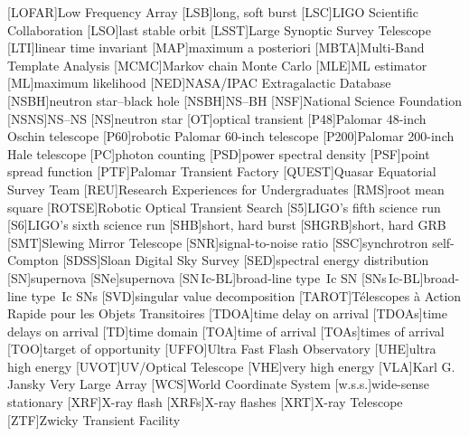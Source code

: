 \begin{acronym}
[LOFAR]{Low Frequency Array}
[LSB]{long, soft burst}
[LSC]{\ac{LIGO} Scientific Collaboration}
[LSO]{last stable orbit}
[LSST]{Large Synoptic Survey Telescope}
[LTI]{linear time invariant}
[MAP]{maximum a posteriori}
[MBTA]{Multi-Band Template Analysis}
[MCMC]{Markov chain Monte Carlo}
[MLE]{\ac{ML} estimator}
[ML]{maximum likelihood}
[NED]{NASA/IPAC Extragalactic Database}
[NSBH]{neutron star\nobreakdashes--black hole}
[NSBH]{\acl{NS}\nobreakdashes--\acl{BH}}
[NSF]{National Science Foundation}
[NSNS]{\acl{NS}\nobreakdashes--\acl{NS}}
[NS]{neutron star}
[OT]{optical transient}
[P48]{Palomar 48\nobreakdashes-inch Oschin telescope}
[P60]{robotic Palomar 60\nobreakdashes-inch telescope}
[P200]{Palomar 200\nobreakdashes-inch Hale telescope}
[PC]{photon counting}
[PSD]{power spectral density}
[PSF]{point spread function}
[PTF]{Palomar Transient Factory}
[QUEST]{Quasar Equatorial Survey Team}
[REU]{Research Experiences for Undergraduates}
[RMS]{root mean square}
[ROTSE]{Robotic Optical Transient Search}
[S5]{\ac{LIGO}'s fifth science run}
[S6]{\ac{LIGO}'s sixth science run}
[SHB]{short, hard burst}
[SHGRB]{short, hard \acl{GRB}}
[SMT]{Slewing Mirror Telescope}
[SNR]{signal\nobreakdashes-to\nobreakdashes-noise ratio}
[SSC]{synchrotron self\nobreakdashes-Compton}
[SDSS]{Sloan Digital Sky Survey}
[SED]{spectral energy distribution}
[SN]{supernova}
[SNe]{supernova}
[\acs{SN}\,Ic\nobreakdashes-BL]{broad\nobreakdashes-line type~Ic \ac{SN}}
[\acsp{SN}\,Ic\nobreakdashes-BL]{broad\nobreakdashes-line type~Ic \acp{SN}}
[SVD]{singular value decomposition}
[TAROT]{T\'{e}lescopes \`{a} Action Rapide pour les Objets Transitoires}
[TDOA]{time delay on arrival}
[TDOAs]{time delays on arrival}
[TD]{time domain}
[TOA]{time of arrival}
[TOAs]{times of arrival}
[TOO]{target of opportunity}
[UFFO]{Ultra Fast Flash Observatory}
[UHE]{ultra high energy}
[UVOT]{UV/Optical Telescope}
[VHE]{very high energy}
[VLA]{Karl G. Jansky Very Large Array}
[WCS]{World Coordinate System}
[w.s.s.]{wide\nobreakdashes-sense stationary}
[XRF]{X\nobreakdashes-ray flash}
[XRFs]{X\nobreakdashes-ray flashes}
[XRT]{X\nobreakdashes-ray Telescope}
[ZTF]{Zwicky Transient Facility}
\end{acronym}
